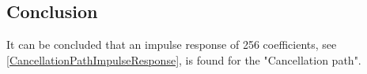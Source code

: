 \subsection{Conclusion}
It can be concluded that an impulse response of 256 coefficients, see \autoref{CancellationPathImpulseResponse}, is found for the "Cancellation path".
